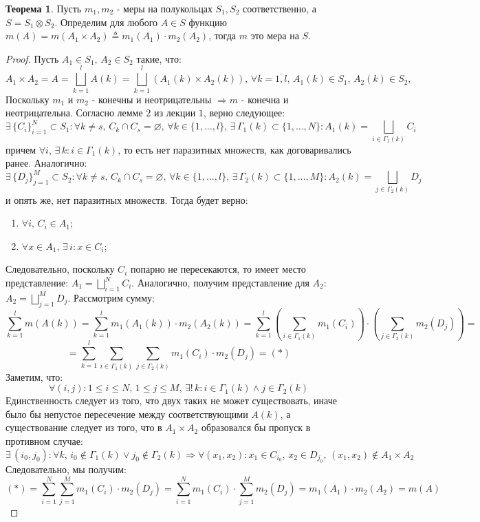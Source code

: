 \documentclass[12pt]{article}
\newcommand{\VN}{\varnothing}
\theoremstyle{definition}
\newtheorem{theorem}{Теорема}
\newcommand{\ddsum}[2]{\displaystyle\sum\limits_{#1}^{#2}}
\newcommand{\ovl}[1]{\overline{#1}}
\begin{document}
\begin{theorem}
	Пусть $m_1, m_2$ - меры на полукольцах $S_1, S_2$ соответственно, а $S = S_1 \otimes S_2$. Определим для любого $A \in S$ функцию $m(A) = m(A_1 \times A_2) \triangleq  m_1(A_1){\cdot}m_2(A_2)$, тогда $m$ это мера на $S$.
\end{theorem}
\begin{proof}
	Пусть $A_1 \in S_1, \, A_2 \in S_2$ такие, что:
	$$
		A_1 \times A_2 = A = \bigsqcup\limits_{k = 1}^{l}A(k) = \bigsqcup\limits_{k = 1}^{l}(A_1(k)\times A_2(k)), \, \forall k = \ovl{1,l}, \, A_1(k) \in S_1, \, A_2(k) \in S_2, \; 
	$$
	Поскольку $m_1$ и $m_2$ - конечны и неотрицательны $\Rightarrow m$ - конечна и неотрицательна. Согласно лемме $2$ из лекции $1$, верно следующее:
	$$
		\exists \, \{C_i\}_{i = 1}^{N} \subset S_1 \colon \forall k \neq s, \, C_k \cap C_s = \VN, \, \forall k \in \{1, \dotsc, l\}, \, \exists \, \Gamma_1(k) \subset \{1,\dotsc, N\} \colon A_1(k) = \bigsqcup\limits_{i \in \Gamma_1(k)}C_i
	$$
	причем $\forall i, \, \exists \, k \colon i \in \Gamma_1(k)$, то есть нет паразитных множеств, как договаривались ранее. Аналогично:
	$$
		\exists \, \{D_j\}_{j = 1}^{M} \subset S_2 \colon \forall  k \neq s, \, C_k \cap C_s = \VN, \, \forall k \in \{1, \dotsc, l\}, \, \exists \, \Gamma_2(k) \subset \{1,\dotsc, M\} \colon A_2(k) = \bigsqcup\limits_{j \in \Gamma_2(k)}D_j
	$$
	и опять же, нет паразитных множеств. Тогда будет верно:
	\begin{enumerate}[label=\arabic*)]
		\item $\forall i, \, C_i \in A_1$;
		\item $\forall x \in A_1, \, \exists \, i \colon x \in C_i$;
	\end{enumerate}
	Следовательно, поскольку $C_i$ попарно не пересекаются, то имеет место представление: $A_1 = \bigsqcup_{i = 1}^{N}C_i$. Аналогично, получим представление для $A_2$: $A_2 = \bigsqcup_{j = 1}^{M}D_j$. Рассмотрим сумму:
	$$
		\ddsum{k = 1}{l}m(A(k)) = \ddsum{k = 1}{l}m_1(A_1(k)){\cdot}m_2(A_2(k)) = \ddsum{k = 1}{l}\left(\ddsum{i \in \Gamma_1(k)}{}m_1(C_i)\right){\cdot}\left(\ddsum{j \in \Gamma_2(k)}{}m_2(D_j)\right) = 
	$$
	$$
		= \ddsum{k = 1}{l}\ddsum{i \in \Gamma_1(k)}{}\ddsum{j \in \Gamma_2(k)}{}m_1(C_i){\cdot}m_2(D_j) = (*)
	$$
	Заметим, что: 
	$$
		\forall (i,j)\colon 1 \leq i \leq N, \, 1 \leq j \leq M, \, \exists! \, k  \colon i \in \Gamma_1(k) \wedge j \in \Gamma_2(k)
	$$
	Единственность следует из того, что двух таких не может существовать, иначе было бы непустое пересечение между соответствующими $A(k)$, а существование следует из того, что в $A_1 \times A_2$ образовался бы пропуск в противном случае:
	$$
		\exists \, (i_0, j_0) \colon \forall k, \, i_0 \not\in \Gamma_1(k) \vee j_0 \not\in \Gamma_2(k) \Rightarrow \forall (x_1, x_2) \colon x_1 \in C_{i_0}, \, x_2 \in D_{j_0}, \, (x_1, x_2) \not\in A_1 \times A_2
	$$
	Следовательно, мы получим:
	$$
		(*) = \ddsum{i = 1}{N}\ddsum{j = 1}{M}m_1(C_i){\cdot}m_2(D_j) = \ddsum{i = 1}{N}m_1(C_i){\cdot}\ddsum{j = 1}{M}m_2(D_j) = m_1(A_1){\cdot}m_2(A_2) = m(A)
	$$
\end{proof}
\end{document}
